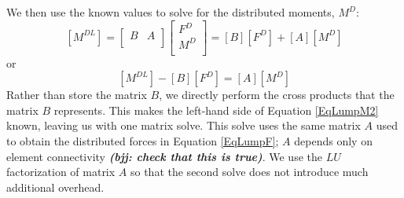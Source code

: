 \documentclass[10pt,letterpaper,oneside,notitlepage]{article}
\begin{document}
We then use the known values to solve for the distributed moments, $M^D$:
\begin{equation}
\label{EqLumpM1}
	\left[	M^{DL} \right]
=
	\begin{bmatrix} B & A \\	\end{bmatrix}
	\begin{bmatrix}
	F^{D} \\
	M^{D} \\
	\end{bmatrix}
= \left[	B \right] \left[	F^D \right] + \left[	A \right] \left[	M^D \right] 
\end{equation}
or
\begin{equation}
\label{EqLumpM2}
\left[	M^{DL} \right] - \left[	B \right] \left[	F^D \right] = \left[	A \right] \left[	M^D \right]
\end{equation}
Rather than store the matrix $B$, we directly perform the cross products that the matrix $B$ represents.
This makes the left-hand side of Equation \ref{EqLumpM2} known, leaving us with one matrix solve. This 
solve uses the same matrix $A$ used to obtain the distributed forces in Equation \ref{EqLumpF}; $A$ depends 
only on element connectivity \textbf{\textit{(bjj: check that this is true)}}. We use 
the $LU$ factorization of matrix $A$ so that the second solve does not introduce much additional overhead.
\end{document}
